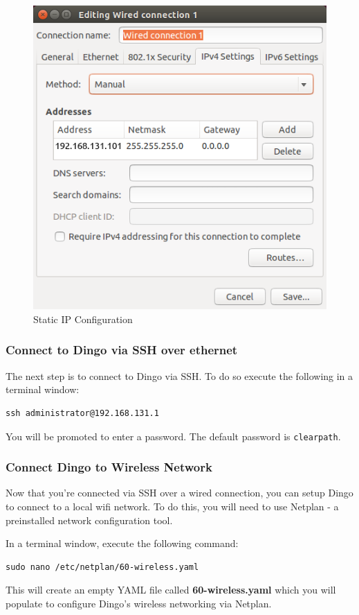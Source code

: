 \documentclass[]{clearpath-latex/clearpath-manual}
\begin{document}
\begin{figure}[H]
  \centering
  \includegraphics[width=0.5\linewidth]{wired_connection.png}
  \caption{Static IP Configuration}
  \label{staticip}
\end{figure}


\subsubsection{Connect to Dingo via SSH over ethernet}

The next step is to connect to Dingo via SSH.  To do so execute the following in a terminal window:

\begin{lstlisting}
ssh administrator@192.168.131.1
\end{lstlisting}

You will be promoted to enter a password.  The default password is \lstinline{clearpath}.

\subsubsection{Connect Dingo to Wireless Network}

Now that you're connected via SSH over a wired connection, you can setup Dingo to connect to a local wifi network. To do this, you will need to use Netplan - a preinstalled network configuration tool.

In a terminal window, execute the following command:

\begin{lstlisting}
sudo nano /etc/netplan/60-wireless.yaml
\end{lstlisting}

This will create an empty YAML file called \textbf{60-wireless.yaml} which you will populate to configure Dingo's wireless networking via Netplan.
\end{document}
